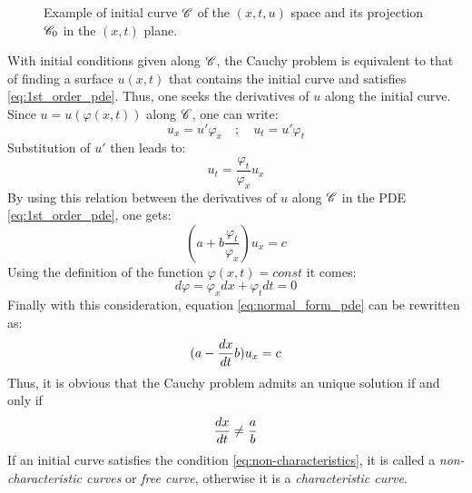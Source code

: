\begin{figure}[h]
  \centering
  
  \caption{Example of initial curve $\mathscr{C}$ of the $(x,t,u)$ space and its projection $\mathscr{C}_0$ in the $(x,t)$ plane.}
  \label{fig:initial_curve}
\end{figure}
With initial conditions given along $\mathscr{C}$, the Cauchy problem is equivalent to that of finding a surface $u(x,t)$ that contains the initial curve and satisfies \eqref{eq:1st_order_pde}. Thus, one seeks the derivatives of $u$ along the initial curve. Since $u=u(\varphi(x,t))$ along $\mathscr{C}$, one can write:
\begin{equation*}
  u_x = u' \varphi_x \quad ; \quad u_t = u' \varphi_t
\end{equation*}
Substitution of $u'$ then leads to:
\begin{equation*}
  u_t = \frac{\varphi_t}{\varphi_x}u_x 
\end{equation*}
By using this relation between the derivatives of $u$ along $\mathscr{C}$ in the PDE \eqref{eq:1st_order_pde}, one gets:
\begin{equation}
  \label{eq:normal_form_pde}
  (a + b\frac{\varphi_t}{\varphi_x})u_x = c
\end{equation}
Using the definition of the function $\varphi(x,t)=const$ it comes:
\begin{equation*}
  d\varphi = \varphi_x dx + \varphi_t dt =0
\end{equation*}
Finally with this consideration, equation \eqref{eq:normal_form_pde} can be rewritten as:
\begin{equation}
  \label{eq:normal_form_pde_2}
  (a - \frac{d x}{d t}b)u_x = c
\end{equation}
Thus, it is obvious that the Cauchy problem admits an unique solution if and only if
\begin{equation}
  \label{eq:non-characteristics}
  \frac{d x}{d t}\neq \frac{a}{b}
\end{equation}
If an initial curve satisfies the condition \eqref{eq:non-characteristics}, it is called a \textit{non-characteristic curves} or \textit{free curve}, otherwise it is a \textit{characteristic curve}. 

